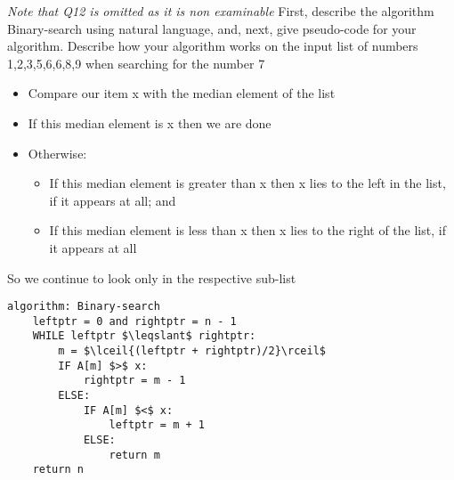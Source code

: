 \documentclass[addpoints]{exam}
\begin{document}
\begin{questions}
\newpage
\textit{Note that Q12 is omitted as it is non examinable}
\setcounter{question}{12}
\question[10]First, describe the algorithm Binary-search using natural language, and, next, give pseudo-code for your algorithm. Describe how your algorithm works on the input list of numbers 1,2,3,5,6,6,8,9 when searching for the number 7
\begin{solution}[2in]
	\begin{itemize}
		\item Compare our item x with the median element of the list
		\item If this median element is x then we are done
		\item Otherwise:
		\begin{itemize}
			\item If this median element is greater than x then x lies to the left in the list, if it appears at all; and
			\item If this median element is less than x then x lies to the right of the list, if it appears at all
		\end{itemize}
	\end{itemize}
So we continue to look only in the respective sub-list
\begin{lstlisting}[tabsize=4,mathescape]
algorithm: Binary-search
	leftptr = 0 and rightptr = n - 1
	WHILE leftptr $\leqslant$ rightptr:
		m = $\lceil{(leftptr + rightptr)/2}\rceil$
		IF A[m] $>$ x:
			rightptr = m - 1
		ELSE:
			IF A[m] $<$ x:
				leftptr = m + 1
			ELSE:
				return m
	return n
\end{lstlisting}
\end{solution}


\end{questions}
\end{document}
